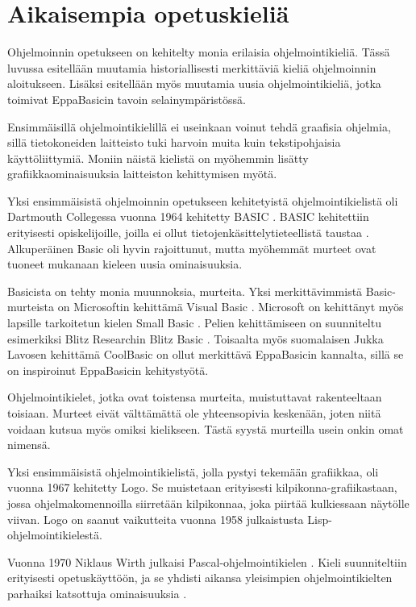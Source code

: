 
\section{Aikaisempia opetuskieliä}
Ohjelmoinnin opetukseen on kehitelty
monia erilaisia ohjelmointikieliä.
Tässä luvussa esitellään muutamia
historiallisesti merkittäviä
kieliä ohjelmoinnin aloitukseen.
Lisäksi esitellään myös muutamia uusia
ohjelmointikieliä, jotka toimivat
EppaBasicin tavoin selainympäristössä.

Ensimmäisillä ohjelmointikielillä
ei useinkaan voinut tehdä graafisia
ohjelmia, sillä tietokoneiden
laitteisto tuki harvoin
muita kuin tekstipohjaisia
käyttöliittymiä.
Moniin näistä kielistä
on myöhemmin lisätty
grafiikkaominaisuuksia laitteiston
kehittymisen myötä.

Yksi ensimmäisistä ohjelmoinnin
opetukseen kehitetyistä
ohjelmointikielistä oli
Dartmouth Collegessa vuonna 1964
kehitetty BASIC \cite{basic}.
BASIC kehitettiin erityisesti
opiskelijoille, joilla ei ollut
tietojenkäsittelytieteellistä
taustaa \cite{language_history}.
Alkuperäinen Basic oli hyvin
rajoittunut, mutta myöhemmät
murteet ovat tuoneet mukanaan
kieleen uusia ominaisuuksia.

Basicista on tehty
monia muunnoksia, murteita.
Yksi merkittävimmistä
Basic-murteista on
Microsoftin kehittämä
Visual Basic \cite{vb.net}.
Microsoft on kehittänyt myös
lapsille tarkoitetun kielen
Small Basic \cite{sb}.
Pelien kehittämiseen on suunniteltu
esimerkiksi Blitz Researchin
Blitz Basic \cite{bb}.
Toisaalta myös suomalaisen
Jukka Lavosen kehittämä
CoolBasic \cite{cb} on ollut merkittävä
EppaBasicin kannalta, sillä
se on inspiroinut EppaBasicin
kehitystyötä.

Ohjelmointikielet, jotka ovat
toistensa murteita,
muistuttavat rakenteeltaan
toisiaan.
Murteet eivät välttämättä
ole yhteensopivia keskenään,
joten niitä voidaan kutsua
myös omiksi kielikseen.
Tästä syystä murteilla
usein onkin omat nimensä.

Yksi ensimmäisistä ohjelmointikielistä,
jolla pystyi tekemään grafiikkaa,
oli vuonna 1967 kehitetty Logo.
Se muistetaan erityisesti
kilpikonna-grafiikastaan,
jossa ohjelmakomennoilla
siirretään kilpikonnaa,
joka piirtää kulkiessaan
näytölle viivan.
Logo on saanut vaikutteita vuonna 1958
julkaistusta Lisp-ohjelmointikielestä.

Vuonna 1970 Niklaus Wirth
julkaisi Pascal-ohjelmointikielen
\cite{pascal}.
Kieli suunniteltiin erityisesti
opetuskäyttöön, ja se yhdisti
aikansa yleisimpien ohjelmointikielten
parhaiksi katsottuja ominaisuuksia
\cite{language_history}.

